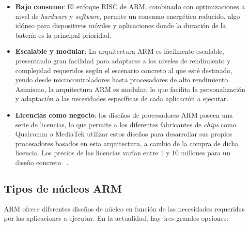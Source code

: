 \begin{itemize}
    \item \textbf{Bajo consumo}: El enfoque \ac{RISC} de \ac{ARM}, combinado con optimizaciones a nivel de \textit{hardware} y \textit{software}, permite un consumo energético reducido, algo idóneo para dispositivos móviles y aplicaciones donde la duración de la batería es la principal prioridad.

    \item \textbf{Escalable y modular}: La arquitectura \ac{ARM} es fácilmente escalable, presentando gran facilidad para adaptarse a los niveles de rendimiento y complejidad requeridos según el escenario concreto al que esté destinado, yendo desde microcontroladores hasta procesadores de alto rendimiento. Asimismo, la arquitectura \ac{ARM} es modular, lo que facilita la personalización y adaptación a las necesidades específicas de cada aplicación a ejecutar.

    \item \textbf{Licencias como negocio}: los diseños de procesadores \ac{ARM} poseen una serie de licencias, lo que permite a los diferentes fabricantes de \textit{chips} como Qualcomm o MediaTek utilizar estos diseños para desarrollar sus propios procesadores basados en esta arquitectura, a cambio de la compra de dicha licencia. Los precios de las licencias varían entre 1 y 10 millones para un diseño concreto ~\cite{precio-licencias-arm}.
\end{itemize}

\subsection{Tipos de núcleos \ac{ARM}}

\ac{ARM} ofrece diferentes diseños de núcleo en función de las necesidades requeridas por las aplicaciones a ejecutar. En la actualidad, hay tres grandes opciones:

